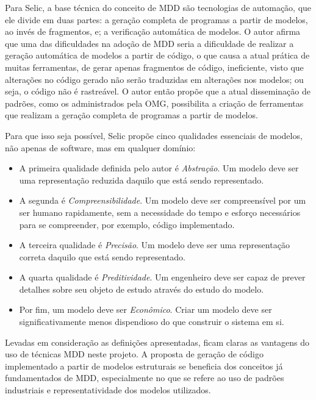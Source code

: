 Para Selic, a base técnica do conceito de MDD são tecnologias de automação, que ele divide em duas partes: a geração completa de programas a partir de modelos, ao invés de fragmentos, e; a verificação automática de modelos. O autor afirma que uma das dificuldades na adoção de MDD seria a dificuldade de realizar a geração automática de modelos a partir de código, o que causa a atual prática de muitas ferramentas, de gerar apenas fragmentos de código, ineficiente, visto que alterações no código gerado não serão traduzidas em alterações nos modelos; ou seja, o código não é rastreável. O autor então propõe que a atual disseminação de padrões, como os administrados pela OMG, possibilita a criação de ferramentas que realizam a geração completa de programas a partir de modelos.

Para que isso seja possível, Selic propõe cinco qualidades essenciais de modelos, não apenas de software, mas em qualquer domínio:

\begin{itemize}
    \item A primeira qualidade definida pelo autor é \textit{Abstração}. Um modelo deve ser uma representação reduzida daquilo que está sendo representado.
    \item A segunda é \textit{Compreensibilidade}. Um modelo deve ser compreensível por um ser humano rapidamente, sem a necessidade do tempo e esforço necessários para se compreender, por exemplo, código implementado.
    \item A terceira qualidade é \textit{Precisão}. Um modelo deve ser uma representação correta daquilo que está sendo representado.
    \item A quarta qualidade é \textit{Preditividade}. Um engenheiro deve ser capaz de prever detalhes sobre seu objeto de estudo através do estudo do modelo.
    \item Por fim, um modelo deve ser \textit{Econômico}. Criar um modelo deve ser significativamente menos dispendioso do que construir o sistema em si.
\end{itemize}

Levadas em consideração as definições apresentadas, ficam claras as vantagens do uso de técnicas MDD neste projeto. A proposta de geração de código implementado a partir de modelos estruturais se beneficia dos conceitos já fundamentados de MDD, especialmente no que se refere ao uso de padrões industriais e representatividade dos modelos utilizados.


